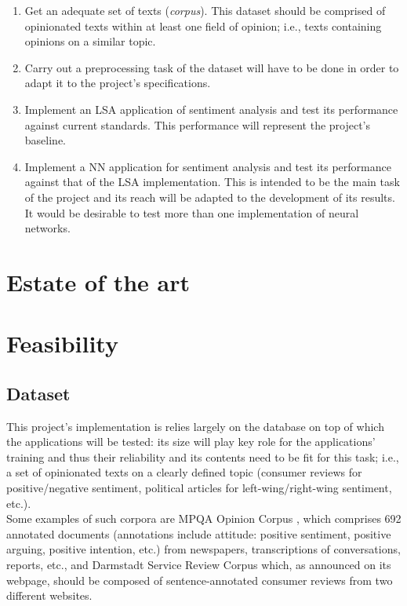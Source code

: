 \documentclass[10pt,a4paper]{report}
\begin{document}
	\begin{enumerate}
		\item Get an adequate set of texts (\textit{corpus}). This dataset should be comprised of opinionated texts within at least one field of opinion; i.e., texts containing opinions on a similar topic.
		
		\item Carry out a preprocessing task of the dataset will have to be done in order to adapt it to the project's specifications.
		
		\item Implement an LSA application of sentiment analysis and test its performance against current standards. This performance will represent the project's baseline.
		
		\item Implement a NN application for sentiment analysis and test its performance against that of the LSA implementation. This is intended to be the main task of the project and its reach will be adapted to the development of its results. It would be desirable to test more than one implementation of neural networks.
		
	\end{enumerate}
	
\chapter{Estate of the art}	
\chapter{Feasibility}

	\section{Dataset}

	This project's implementation is relies largely on the database on top of which the applications will be tested: its size will play key role for the applications' training and thus their reliability and its contents need to be fit for this task; i.e., a set of opinionated texts on a clearly defined topic (consumer reviews for positive/negative sentiment, political articles for left-wing/right-wing sentiment, etc.).\\
	
	Some examples of such corpora are MPQA Opinion Corpus \cite{mpqa}, which comprises 692 annotated documents (annotations include attitude: positive sentiment, positive arguing, positive intention, etc.) from newspapers, transcriptions of conversations, reports, etc., and Darmstadt Service Review Corpus \cite{dsrc} which, as announced on its webpage, should be composed of sentence-annotated consumer reviews from two different websites.
	
\end{document}
